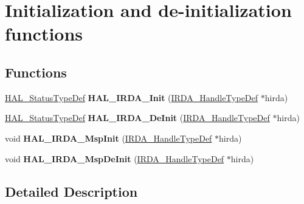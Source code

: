 \hypertarget{group___i_r_d_a___exported___functions___group1}{}\section{Initialization and de-\/initialization functions}
\label{group___i_r_d_a___exported___functions___group1}
\subsection*{Functions}
\begin{DoxyCompactItemize}
\item 
\mbox{\label{group___i_r_d_a___exported___functions___group1_ga4a41c32a70503a33c238511e3a402aa6}} 
\hyperlink{stm32f0xx__hal__def_8h_a63c0679d1cb8b8c684fbb0632743478f}{H\+A\+L\+\_\+\+Status\+Type\+Def} {\bfseries H\+A\+L\+\_\+\+I\+R\+D\+A\+\_\+\+Init} (\hyperlink{struct_i_r_d_a___handle_type_def}{I\+R\+D\+A\+\_\+\+Handle\+Type\+Def} $\ast$hirda)
\item 
\mbox{\label{group___i_r_d_a___exported___functions___group1_ga2fc5f408dc349561f0a685144813ea77}} 
\hyperlink{stm32f0xx__hal__def_8h_a63c0679d1cb8b8c684fbb0632743478f}{H\+A\+L\+\_\+\+Status\+Type\+Def} {\bfseries H\+A\+L\+\_\+\+I\+R\+D\+A\+\_\+\+De\+Init} (\hyperlink{struct_i_r_d_a___handle_type_def}{I\+R\+D\+A\+\_\+\+Handle\+Type\+Def} $\ast$hirda)
\item 
\mbox{\label{group___i_r_d_a___exported___functions___group1_ga76075c1def7959ef153a0cdeb564ee0d}} 
void {\bfseries H\+A\+L\+\_\+\+I\+R\+D\+A\+\_\+\+Msp\+Init} (\hyperlink{struct_i_r_d_a___handle_type_def}{I\+R\+D\+A\+\_\+\+Handle\+Type\+Def} $\ast$hirda)
\item 
\mbox{\label{group___i_r_d_a___exported___functions___group1_ga1f75d9b05cc84c2ca82a5f453942ab7f}} 
void {\bfseries H\+A\+L\+\_\+\+I\+R\+D\+A\+\_\+\+Msp\+De\+Init} (\hyperlink{struct_i_r_d_a___handle_type_def}{I\+R\+D\+A\+\_\+\+Handle\+Type\+Def} $\ast$hirda)
\end{DoxyCompactItemize}


\subsection{Detailed Description}
